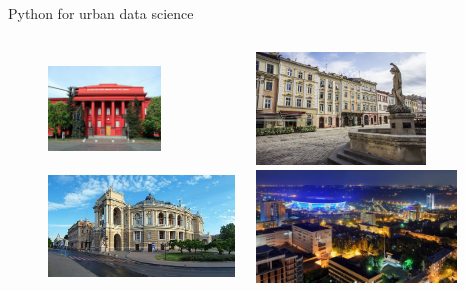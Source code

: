 \documentclass{beamer}
\begin{document}
\begin{frame}{Python for urban data science}
\begin{figure}

\begin{columns}[t]

\centering

\includegraphics[width=3cm,height=3cm]{images/point_kyiv.jpg}
\includegraphics[height=3cm]{images/point_odesa.jpg}
\begin{center}

\includegraphics[height=3cm]{images/point_lviv.jpg}
\includegraphics[height=3cm]{images/point_donetsk.jpg}
\end{center}

\end{columns}
\end{figure}
\end{frame}
\end{document}
